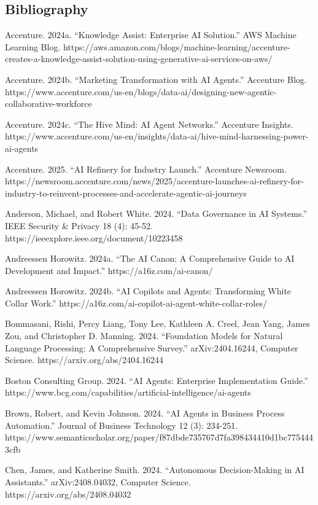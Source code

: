 \documentclass[
]{article}
\begin{document}
\subsection{Bibliography}\label{bibliography}

Accenture. 2024a. ``Knowledge Assist: Enterprise AI Solution.'' AWS
Machine Learning Blog.
https://aws.amazon.com/blogs/machine-learning/accenture-creates-a-knowledge-assist-solution-using-generative-ai-services-on-aws/

Accenture. 2024b. ``Marketing Transformation with AI Agents.'' Accenture
Blog.
https://www.accenture.com/us-en/blogs/data-ai/designing-new-agentic-collaborative-workforce

Accenture. 2024c. ``The Hive Mind: AI Agent Networks.'' Accenture
Insights.
https://www.accenture.com/us-en/insights/data-ai/hive-mind-harnessing-power-ai-agents

Accenture. 2025. ``AI Refinery for Industry Launch.'' Accenture
Newsroom.
https://newsroom.accenture.com/news/2025/accenture-launches-ai-refinery-for-industry-to-reinvent-processes-and-accelerate-agentic-ai-journeys

Anderson, Michael, and Robert White. 2024. ``Data Governance in AI
Systems.'' IEEE Security \& Privacy 18 (4): 45-52.
https://ieeexplore.ieee.org/document/10223458

Andreessen Horowitz. 2024a. ``The AI Canon: A Comprehensive Guide to AI
Development and Impact.'' https://a16z.com/ai-canon/

Andreessen Horowitz. 2024b. ``AI Copilots and Agents: Transforming White
Collar Work.'' https://a16z.com/ai-copilot-ai-agent-white-collar-roles/

Bommasani, Rishi, Percy Liang, Tony Lee, Kathleen A. Creel, Jean Yang,
James Zou, and Christopher D. Manning. 2024. ``Foundation Models for
Natural Language Processing: A Comprehensive Survey.'' arXiv:2404.16244,
Computer Science. https://arxiv.org/abs/2404.16244

Boston Consulting Group. 2024. ``AI Agents: Enterprise Implementation
Guide.''
https://www.bcg.com/capabilities/artificial-intelligence/ai-agents

Brown, Robert, and Kevin Johnson. 2024. ``AI Agents in Business Process
Automation.'' Journal of Business Technology 12 (3): 234-251.
https://www.semanticscholar.org/paper/f87dbde735767d7fa398434410d1bc7754443cfb

Chen, James, and Katherine Smith. 2024. ``Autonomous Decision-Making in
AI Assistants.'' arXiv:2408.04032, Computer Science.
https://arxiv.org/abs/2408.04032
\end{document}
